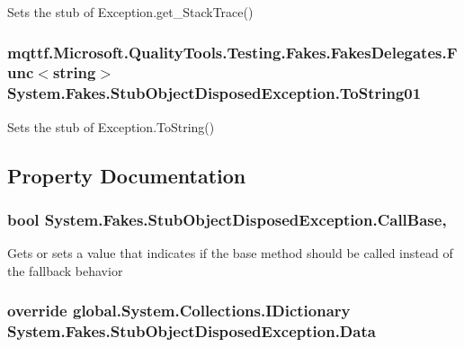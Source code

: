 Sets the stub of Exception.\-get\-\_\-\-Stack\-Trace()

\hypertarget{class_system_1_1_fakes_1_1_stub_object_disposed_exception_a7dd232f82df2768c094703772113991c}{
\subsubsection[{To\-String01}]{\setlength{\rightskip}{0pt plus 5cm}mqttf.\-Microsoft.\-Quality\-Tools.\-Testing.\-Fakes.\-Fakes\-Delegates.\-Func$<$string$>$ System.\-Fakes.\-Stub\-Object\-Disposed\-Exception.\-To\-String01}}\label{class_system_1_1_fakes_1_1_stub_object_disposed_exception_a7dd232f82df2768c094703772113991c}


Sets the stub of Exception.\-To\-String()



\subsection{Property Documentation}
\hypertarget{class_system_1_1_fakes_1_1_stub_object_disposed_exception_a67a5124624ae80b1e064c1afc7063080}{
\subsubsection[{Call\-Base}]{\setlength{\rightskip}{0pt plus 5cm}bool System.\-Fakes.\-Stub\-Object\-Disposed\-Exception.\-Call\-Base\hspace{0.3cm}{\ttfamily [get]}, {\ttfamily [set]}}}\label{class_system_1_1_fakes_1_1_stub_object_disposed_exception_a67a5124624ae80b1e064c1afc7063080}


Gets or sets a value that indicates if the base method should be called instead of the fallback behavior

\hypertarget{class_system_1_1_fakes_1_1_stub_object_disposed_exception_a217a7dca49e45ea51212903a0796b448}{
\subsubsection[{Data}]{\setlength{\rightskip}{0pt plus 5cm}override global.\-System.\-Collections.\-I\-Dictionary System.\-Fakes.\-Stub\-Object\-Disposed\-Exception.\-Data\hspace{0.3cm}{\ttfamily [get]}}}\label{class_system_1_1_fakes_1_1_stub_object_disposed_exception_a217a7dca49e45ea51212903a0796b448}


